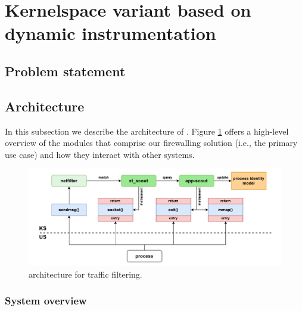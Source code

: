 \section{Kernelspace variant based on dynamic instrumentation}
\label{appfw:appscout}

\subsection{Problem statement}


\subsection{Architecture}
\label{apffw:appscout:architecture}

In this subsection we describe the architecture of \scout{}. Figure
\ref{appfw:appscout:fig:sys-architecture} offers a high-level overview of the
modules that comprise our firewalling solution (i.e., the primary use case) and
how they interact with other systems.

\begin{figure}
    \vspace{-15pt}

    \centering
    \includegraphics[width=\textwidth,keepaspectratio]{figures/appscout-architecture.pdf}
    \caption{\scout{} architecture for traffic filtering.}
    \label{appfw:appscout:fig:sys-architecture}

    \vspace{-32pt}
\end{figure}


\subsubsection{System overview}

